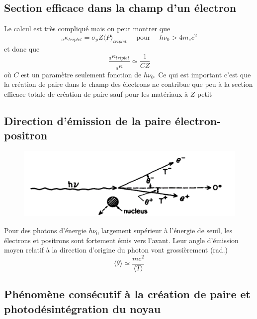 \subsection{Section efficace dans la champ d'un électron}
Le calcul est très compliqué mais on peut montrer que
\begin{equation}
{}_a\kappa_{triplet}=\sigma_pZ\langle P\rangle_{triplet}{\mbox{~~~~pour~~~~}}h\nu_0>4m_ec^2
\end{equation}
et donc que
\begin{equation}
\frac{{}_a\kappa_{triplet}}{{}_a\kappa}\simeq \frac{1}{CZ}
\end{equation}
où $C$ est un paramètre seulement fonction de $h\nu_0$. Ce qui est important c'est que 
la création de paire dans le champ des électrons ne contribue que peu à la section efficace 
totale de création de paire sauf pour les matériaux à $Z$ petit 

\subsection{Direction d'émission de la paire électron-positron}%
	\begin{figure}
	\vspace{-5mm}
	\includegraphics[scale=0.24]{ch4/image14}
	\end{figure}
	
Pour des photons d'énergie $h\nu_0$ largement supérieur à l'énergie de seuil, les électrons et 
positrons sont fortement émis vers l'avant. Leur angle d'émission moyen relatif à la direction
d'origine du photon vont grossièrement (rad.)
\begin{equation}
\langle \theta \rangle \simeq \frac{mc^2}{\langle T \rangle}
\end{equation}






\subsection{Phénomène consécutif à la création de paire et photodésintégration du noyau} 
